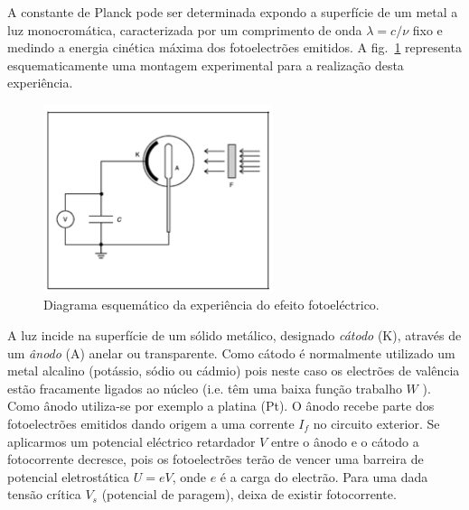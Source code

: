 \documentclass[a4paper,12pt]{article}  %
\begin{document}

A constante de Planck pode ser determinada expondo a superfície de um metal a luz monocromática, caracterizada por um comprimento de onda $\lambda=c /\nu$ fixo e medindo a energia cinética máxima dos fotoelectrões emitidos. A fig.~\ref{fig:plack_exp} representa esquematicamente uma montagem experimental para a realização desta experiência.

\begin{figure}[htb] 
	\centering 
	\includegraphics[width=0.6\textwidth]{planck_exp} 
	\caption{Diagrama esquemático da experiência do efeito fotoeléctrico.} \label{fig:plack_exp}
\end{figure}


A luz incide na superfície de um sólido metálico, designado \emph{cátodo} (K), através de um \emph{ânodo} (A) anelar ou transparente. 
Como cátodo é normalmente utilizado um metal alcalino (potássio, sódio ou cádmio)  pois neste caso os electrões de valência estão fracamente 
ligados ao núcleo (i.e. têm uma baixa função trabalho $W$ ). Como ânodo utiliza-se por exemplo a platina (Pt). 
O ânodo recebe parte dos fotoelectrões emitidos dando origem a uma corrente $I_f$ no circuito exterior. 
Se aplicarmos um potencial eléctrico retardador $V$ entre o ânodo e o cátodo a fotocorrente decresce, pois os fotoelectrões terão de vencer uma barreira de potencial eletrostática $U=e V$, onde $e$ é a carga do electrão. 
Para uma dada tensão crítica $V_s$ (potencial de paragem), deixa de existir fotocorrente. 
\end{document}
